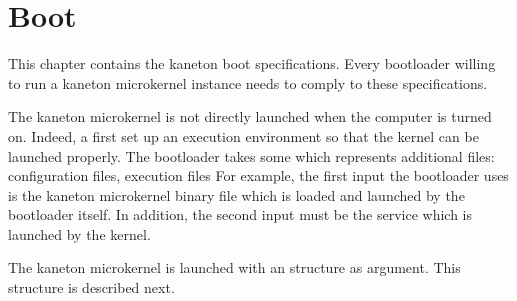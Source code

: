 %
%
%
%
%
%

%
%

\chapter{Boot}
\label{chapter:label}

This chapter contains the kaneton boot specifications. Every bootloader
willing to run a kaneton microkernel instance needs to comply to these
specifications.

\newpage

%
%

The kaneton microkernel is not directly launched when the computer is
turned on. Indeed, a  first set up an execution environment
so that the kernel can be launched properly. The bootloader takes some
 which represents additional files: configuration files,
execution files \etc{} For example, the first input the bootloader uses is
the kaneton microkernel binary file which is loaded and launched by the
bootloader itself. In addition, the second input must be the 
service which is launched by the kernel.

The kaneton microkernel is launched with an  structure
as argument. This structure is described next.

